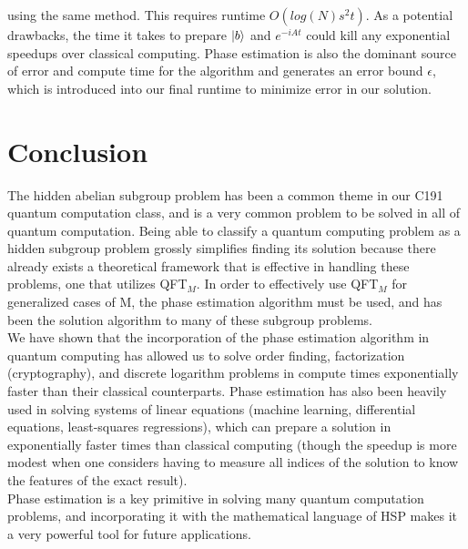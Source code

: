 \documentclass[11pt]{journal}
\begin{document}
using the same method. This requires runtime $O(log(N)s^2 t)$. As a potential drawbacks, the time it takes to prepare $\ket{b}$ and $e^{-iAt}$ could kill any exponential speedups over classical computing. Phase estimation is also the dominant source of error and compute time for the algorithm and generates an error bound $\epsilon$, which is introduced into our final runtime to minimize error in our solution. \cite{sle1}\cite{sle2}\cite{sle3}




\section{Conclusion}
    The hidden abelian subgroup problem has been a common theme in our C191 quantum computation class, and is a very common problem to be solved in all of quantum computation. Being able to classify a quantum computing problem as a hidden subgroup problem grossly simplifies finding its solution because there already exists a theoretical framework that is effective in handling these problems, one that utilizes QFT$_M$. In order to effectively use QFT$_M$ for generalized cases of M, the phase estimation algorithm must be used, and has been the solution algorithm to many of these subgroup problems. 
    \\\indent We have shown that the incorporation of the phase estimation algorithm in quantum computing has allowed us to solve order finding, factorization (cryptography), and discrete logarithm problems in compute times exponentially faster than their classical counterparts. Phase estimation has also been heavily used in solving systems of linear equations (machine learning, differential equations, least-squares regressions), which can prepare a solution in exponentially faster times than classical computing (though the speedup is more modest when one considers having to measure all indices of the solution to know the features of the exact result).
    \\\indent Phase estimation is a key primitive in solving many quantum computation problems, and incorporating it with the mathematical language of HSP makes it a very powerful tool for future applications.
    
\end{document}
